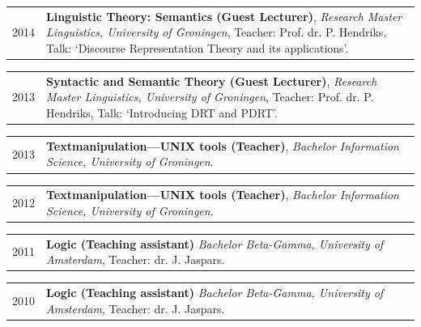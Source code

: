 \documentclass[a4paper,10pt]{article}
\def\leftcolwidth{.12\textwidth}
\def\tablevspace{10pt}
\begin{document}
\vspace{\tablevspace}

\noindent
\begin{tabularx}{\textwidth}{ p{\leftcolwidth} X }
  2014
  & \textbf{Linguistic Theory: Semantics (Guest Lecturer)}, 
    \textit{Research Master Linguistics, University of Groningen},
    Teacher: Prof. dr. P. Hendriks,
    Talk: `Discourse Representation Theory and its applications'.
\end{tabularx}

\vspace{\tablevspace}

\noindent
\begin{tabularx}{\textwidth}{ p{\leftcolwidth} X }
  2013
  & \textbf{Syntactic and Semantic Theory (Guest Lecturer)},
    \textit{Research Master Linguistics, University of Groningen},
    Teacher: Prof. dr. P. Hendriks,
    Talk: `Introducing DRT and PDRT'.
\end{tabularx}

\vspace{\tablevspace}

\noindent
\begin{tabularx}{\textwidth}{ p{\leftcolwidth} X }
  2013
  & \textbf{Textmanipulation---UNIX tools (Teacher)}, 
    \textit{Bachelor Information Science, University of Groningen}.\\
\end{tabularx}

\vspace{\tablevspace}

\noindent
\begin{tabularx}{\textwidth}{ p{\leftcolwidth} X }
  2012
  & \textbf{Textmanipulation---UNIX tools (Teacher)}, 
    \textit{Bachelor Information Science, University of Groningen}.\\
\end{tabularx}

\vspace{\tablevspace}

\noindent
\begin{tabularx}{\textwidth}{ p{\leftcolwidth} X }
  2011
  & \textbf{Logic (Teaching assistant)}
    \textit{Bachelor Beta-Gamma, University of Amsterdam},
    Teacher: dr. J. Jaspars.
\end{tabularx}

\vspace{\tablevspace}

\noindent
\begin{tabularx}{\textwidth}{ p{\leftcolwidth} X }
  2010
  & \textbf{Logic (Teaching assistant)}
    \textit{Bachelor Beta-Gamma, University of Amsterdam},
    Teacher: dr. J. Jaspars.
\end{tabularx}
\end{document}
